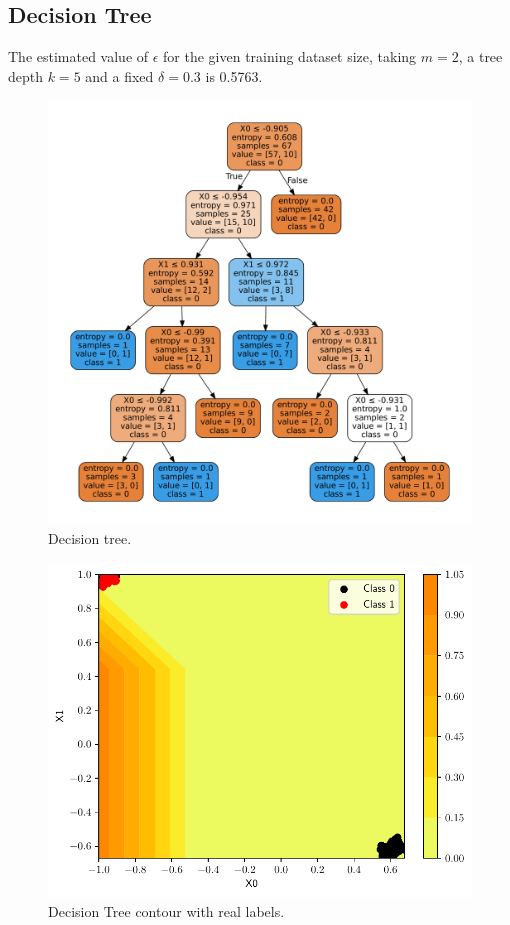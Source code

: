 \documentclass[conference]{IEEEtran}
\theoremstyle{definition}
\theoremstyle{remark}
\theoremstyle{remark}
\begin{document}
\subsection{Decision Tree}
The estimated value of $\epsilon$ for the given training dataset size, taking
$m=2$, a tree depth $k=5$ and a fixed $\delta=0.3$ is 0.5763.
\begin{figure}
  \includegraphics[width=\columnwidth]{figs/tree-emb-graph.pdf}
  \caption{Decision tree.}
\end{figure}

\begin{figure}
  \includegraphics[width=\columnwidth]{figs/tree-contour-0-1.pdf}
  \caption{Decision Tree contour with real labels.}
\end{figure}
\end{document}
